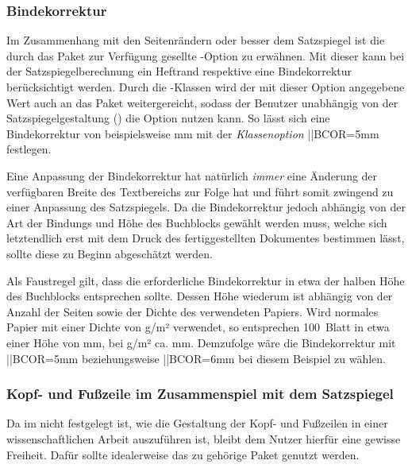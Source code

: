 \begin{DeclareEntity*}{}
\begin{DeclareEntity*}{}
\begin{DeclareEntity*}{}
\subsubsection{%
  Bindekorrektur%
}
%
Im Zusammenhang mit den Seitenrändern oder besser dem Satzspiegel ist die durch 
das Paket  zur Verfügung gesellte \KOMAScript-Option 
 zu erwähnen. Mit dieser kann bei 
der Satzspiegelberechnung ein Heftrand respektive eine Bindekorrektur 
berücksichtigt werden. Durch die \TUDScript-Klassen wird der mit dieser Option 
angegebene Wert auch an das Paket  weitergereicht, sodass der 
Benutzer unabhängig von der Satzspiegelgestaltung () die 
Option  nutzen kann. So lässt sich eine Bindekorrektur von 
beispielsweise \unit[5]{mm} mit der \emph{Klassenoption} \Option||{BCOR=5mm} 
festlegen.

Eine Anpassung der Bindekorrektur hat natürlich \emph{immer} eine Änderung der 
verfügbaren Breite des Textbereichs zur Folge hat und führt somit zwingend zu 
einer Anpassung des Satzspiegels. Da die Bindekorrektur jedoch abhängig von der 
Art der Bindungs und Höhe des Buchblocks gewählt werden muss, welche sich 
letztendlich erst mit dem Druck des fertiggestellten Dokumentes bestimmen 
lässt, sollte diese zu Beginn abgeschätzt werden.
%
\begin{Example}
Als Faustregel gilt, dass die erforderliche Bindekorrektur in etwa der halben 
Höhe des Buchblocks entsprechen sollte. Dessen Höhe wiederum ist abhängig von 
der Anzahl der Seiten sowie der Dichte des verwendeten Papiers. Wird normales 
Papier mit einer Dichte von \unit[80]{g/m²} verwendet, so entsprechen 100~Blatt 
in etwa einer Höhe von \unit[10]{mm}, bei \unit[100]{g/m²} ca. \unit[12]{mm}. 
Demzufolge wäre die Bindekorrektur mit \Option||{BCOR=5mm} beziehungsweise 
\Option||{BCOR=6mm} bei diesem Beispiel zu wählen.%
\end{Example}



\subsubsection{%
  Kopf- und Fußzeile im Zusammenspiel mit dem Satzspiegel%
}
%
Da im \CD nicht festgelegt ist, wie die Gestaltung der Kopf- und Fußzeilen in 
einer wissenschaftlichen Arbeit auszuführen ist, bleibt dem Nutzer hierfür eine 
gewisse Freiheit. Dafür sollte idealerweise das zu \KOMAScript gehörige Paket 
 genutzt werden. 


\end{DeclareEntity*}
\end{DeclareEntity*}
\end{DeclareEntity*}
